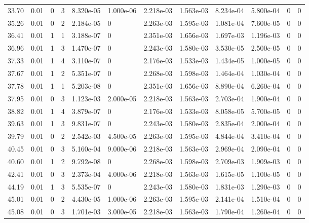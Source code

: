 \documentclass[preview]{standalone}
\begin{document}
{{{\begin{tabular}{L{1.2cm}C{1.2cm} C{0.3cm}C{0.5cm} C{1.4cm}C{1.4cm} C{1.4cm}C{1.4cm} C{1.6cm}C{1.6cm} C{1.6cm}C{1.6cm}}
  33.70  &  0.01  & 0     &  3 &  8.320e-05  & 1.000e-06  &  2.218e-03&   1.563e-03& 8.234e-04 & 5.800e-04   &  0 & 0  \\ 
  35.26  &  0.01  & 0     &  2 &  2.184e-05  & 0  &  2.263e-03&   1.595e-03& 1.081e-04 & 7.600e-05   &  0 & 0  \\ 
  36.41  &  0.01  & 1     &  1 &  3.188e-07  & 0  &  2.351e-03&   1.656e-03& 1.697e-03 & 1.196e-03   &  0 & 0  \\ 
  36.96  &  0.01  & 1     &  3 &  1.470e-07  & 0  &  2.243e-03&   1.580e-03& 3.530e-05 & 2.500e-05   &  0 & 0  \\ 
  37.33  &  0.01  & 1     &  4 &  3.110e-07  & 0  &  2.176e-03&   1.533e-03& 1.434e-05 & 1.000e-05   &  0 & 0  \\ 
  37.67  &  0.01  & 1     &  2 &  5.351e-07  & 0  &  2.268e-03&   1.598e-03& 1.464e-04 & 1.030e-04   &  0 & 0  \\ 
  37.78  &  0.01  & 1     &  1 &  5.203e-08  & 0  &  2.351e-03&   1.656e-03& 8.890e-04 & 6.260e-04   &  0 & 0  \\ 
  37.95  &  0.01  & 0     &  3 &  1.123e-03  & 2.000e-05  &  2.218e-03&   1.563e-03& 2.703e-04 & 1.900e-04   &  0 & 0  \\ 
  38.82  &  0.01  & 1     &  4 &  3.879e-07  & 0  &  2.176e-03&   1.533e-03& 8.058e-05 & 5.700e-05   &  0 & 0  \\ 
  39.63  &  0.01  & 1     &  3 &  9.831e-07  & 0  &  2.243e-03&   1.580e-03& 2.835e-04 & 2.000e-04   &  0 & 0  \\ 
  39.79  &  0.01  & 0     &  2 &  2.542e-03  & 4.500e-05  &  2.263e-03&   1.595e-03& 4.844e-04 & 3.410e-04   &  0 & 0  \\ 
  40.45  &  0.01  & 0     &  3 &  5.160e-04  & 9.000e-06  &  2.218e-03&   1.563e-03& 2.969e-04 & 2.090e-04   &  0 & 0  \\ 
  40.60  &  0.01  & 1     &  2 &  9.792e-08  & 0  &  2.268e-03&   1.598e-03& 2.709e-03 & 1.909e-03   &  0 & 0  \\ 
  42.41  &  0.01  & 0     &  3 &  2.373e-04  & 4.000e-06  &  2.218e-03&   1.563e-03& 1.615e-05 & 1.100e-05   &  0 & 0  \\ 
  44.19  &  0.01  & 1     &  3 &  5.535e-07  & 0  &  2.243e-03&   1.580e-03& 1.831e-03 & 1.290e-03   &  0 & 0  \\ 
  45.01  &  0.01  & 0     &  2 &  4.430e-05  & 1.000e-06  &  2.263e-03&   1.595e-03& 2.141e-04 & 1.510e-04   &  0 & 0  \\ 
  45.08  &  0.01  & 0     &  3 &  1.701e-03  & 3.000e-05  &  2.218e-03&   1.563e-03& 1.790e-04 & 1.260e-04   &  0 & 0  \\ 

\end{tabular}}}}
\end{document}
